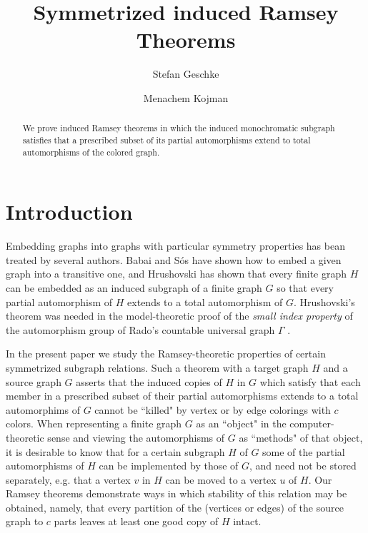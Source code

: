 \documentclass[11pt]{amsart}
\title{Symmetrized induced Ramsey Theorems}
\author{Stefan Geschke}
\author{Menachem Kojman}
\begin{document}
\maketitle

\begin{abstract} We prove induced Ramsey theorems in which the induced
monochromatic subgraph satisfies that a prescribed subset of its
partial
automorphisms extend to total automorphisms of the colored graph.
\end{abstract}

\section{Introduction}


Embedding graphs into graphs with particular symmetry properties has
bean
treated by several authors. Babai and S\'os \cite{BS} have shown how
to
embed a given graph into a transitive one, and Hrushovski \cite{H} has
shown that every finite graph $H$ can be embedded as an induced
subgraph
of a finite graph $G$ so that every partial automorphism of $H$
extends
to a total automorphism of $G$. Hrushovski's theorem was needed
in the model-theoretic proof of the \emph{small index property} of the
automorphism group of Rado's
countable universal graph $\Gamma$ \cite{HHLS}.

In the present paper we study the Ramsey-theoretic properties of
certain
symmetrized subgraph relations. Such a theorem with a target graph $H$
and
a source graph $G$ asserts that the induced copies of $H$ in $G$ which
satisfy that each member in a prescribed subset of their partial
automorphisms extends to a total automorphims of $G$ cannot be
``killed" by
vertex or by edge colorings with $c$ colors. When representing a
finite
graph $G$ as an ``object" in the computer-theoretic sense and viewing
the
automorphisms of $G$ as ``methods" of that object, it is desirable to
know
that for a certain subgraph $H$ of $G$ some of the partial
automorphisms
of $H$ can be implemented by those of $G$, and need not be stored
separately, e.g. that a vertex $v$ in $H$ can be moved to a vertex $u$
of
$H$. Our Ramsey theorems demonstrate ways in which stability
of this relation may be obtained, namely, that every partition of the
(vertices or edges) of the source graph to $c$ parts leaves at
least one good copy of $H$ intact.
\end{document}
